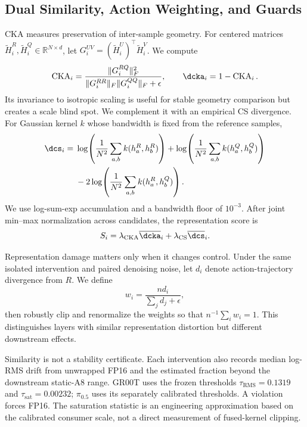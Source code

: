 \subsection{Dual Similarity, Action Weighting, and Guards}
\label{sec:dual_scores}

CKA measures preservation of inter-sample geometry. For centered matrices $\widetilde H_i^R,\widetilde H_i^Q\in\mathbb{R}^{N\times d}$, let $G_i^{UV}=(\widetilde H_i^U)^{\!\top}\widetilde H_i^V$. We compute
\begin{equation}
\operatorname{CKA}_i=
\frac{\|G_i^{RQ}\|_F^2}
{\|G_i^{RR}\|_F\|G_i^{QQ}\|_F+\epsilon},
\qquad \dcka_i=1-\operatorname{CKA}_i.
\label{eq:cka}
\end{equation}
Its invariance to isotropic scaling is useful for stable geometry comparison but creates a scale blind spot. We complement it with an empirical CS divergence. For Gaussian kernel $k$ whose bandwidth is fixed from the reference samples,
\begin{align}
\dcs_i={}&\log\!\left(\frac{1}{N^2}\sum_{a,b}k(h_a^R,h_b^R)\right)
+\log\!\left(\frac{1}{N^2}\sum_{a,b}k(h_a^Q,h_b^Q)\right)\nonumber\\
&-2\log\!\left(\frac{1}{N^2}\sum_{a,b}k(h_a^R,h_b^Q)\right).
\label{eq:cs}
\end{align}
We use log-sum-exp accumulation and a bandwidth floor of $10^{-3}$. After joint min--max normalization across candidates, the representation score is
\begin{equation}
S_i=\lambda_{\mathrm{CKA}}\overline{\dcka}_i+
    \lambda_{\mathrm{CS}}\overline{\dcs}_i.
\label{eq:dual_score}
\end{equation}

Representation damage matters only when it changes control. Under the same isolated intervention and paired denoising noise, let $d_i$ denote action-trajectory divergence from $R$. We define
\begin{equation}
    w_i=\frac{n d_i}{\sum_j d_j+\epsilon},
    \label{eq:action_weight}
\end{equation}
then robustly clip and renormalize the weights so that $n^{-1}\sum_i w_i=1$. This distinguishes layers with similar representation distortion but different downstream effects.

Similarity is not a stability certificate. Each intervention also records median log-RMS drift from unwrapped FP16 and the estimated fraction beyond the downstream static-A8 range. GR00T uses the frozen thresholds $\tau_{\mathrm{RMS}}=0.1319$ and $\tau_{\mathrm{sat}}=0.00232$; $\pi_{0.5}$ uses its separately calibrated thresholds. A violation forces FP16. The saturation statistic is an engineering approximation based on the calibrated consumer scale, not a direct measurement of fused-kernel clipping.

